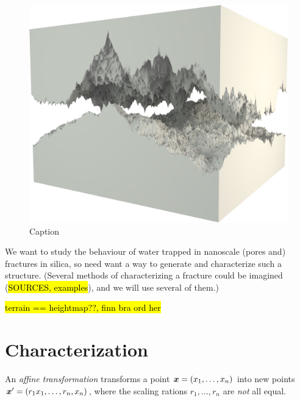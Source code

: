 
\begin{figure}[h!]
    \centering
    \includegraphics[width=\textwidth]{images/fracture/large_fracture05.jpg}
    \caption{Caption}
\end{figure}

We want to study the behaviour of water trapped in nanoscale (pores and) fractures in silica, so need want a way to generate and characterize such a structure. (Several methods of characterizing a fracture could be imagined (\hl{SOURCES, examples}), and we will use several of them.)        

\hl{terrain == heightmap??, finn bra ord her}

\chapter{Characterization}

An \emph{affine transformation} transforms a point $\boldsymbol{x} = (x_1, \dots, x_n)$ into new points $\boldsymbol{x}' = (r_1x_1, \dots, r_n, x_n)$, where the scaling rations $r_1, \dots, r_n$ are \emph{not} all equal.

